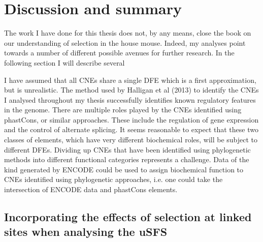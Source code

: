 \chapter{Discussion and summary}

The work I have done for this thesis does not, by any means, close the book on our understanding of selection in the house mouse. Indeed, my analyses point towards a number of different possible avenues for further research. In the following section I will describe several 

I have assumed that all CNEs share a single DFE which is a first approximation, but is unrealistic. The method used by Halligan et al (2013) to identify the CNEs I analysed throughout my thesis successfully identifies known regulatory features in the genome. There are multiple roles played by the CNEs identified using phastCons, or similar approaches. These include the regulation of gene expression and the control of alternate splicing. It seems reasonable to expect that these two classes of elements, which have very different biochemical roles, will be subject to different DFEs. Dividing up CNEs that have been identified using phylogenetic methods into different functional categories represents a challenge. Data of the kind generated by ENCODE could be used to assign biochemical function to CNEs identified using phylogenetic approaches, i.e. one could take the intersection of ENCODE data and phastCons elements.

\section{Incorporating the effects of selection at linked sites when analysing the uSFS}

